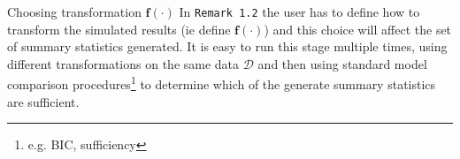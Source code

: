 \documentclass[11pt,a4paper]{article}
\begin{document}
  \begin{remark}{Choosing transformation $\mathbf{f}(\cdot)$}
    In \texttt{Remark 1.2}  the user has to define how to transform the simulated results (ie define $\mathbf{f}(\cdot)$) and this choice will affect the set of summary statistics generated. It is easy to run this stage multiple times, using different transformations on the same data $\mathcal{D}$ and then using standard model comparison procedures\footnote{e.g. BIC, sufficiency} to determine which of the generate summary statistics are sufficient.
  \end{remark}
\end{document}
